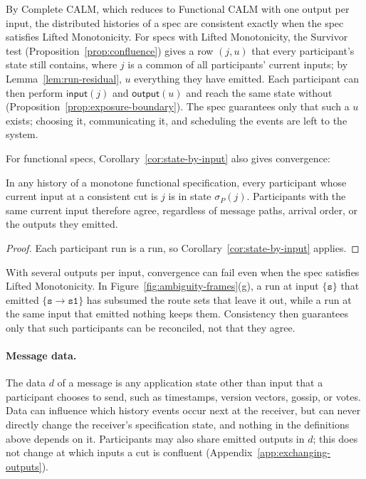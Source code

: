 By Complete CALM, which reduces to Functional CALM with one output per input,
the distributed histories of a spec are consistent exactly when the spec
satisfies Lifted Monotonicity.  For specs with Lifted Monotonicity, the Survivor test
(Proposition~\ref{prop:confluence}) gives a row $(j,u)$ that every participant's
state still contains, where $j$ is a common \indesc of all participants' current
inputs; by Lemma~\ref{lem:run-residual}, $u$ \outrel everything they have
emitted.  Each participant can then perform $\mathsf{input}(j)$ and
$\mathsf{output}(u)$ and reach the same state without \commitment
(Proposition~\ref{prop:exposure-boundary}).  The spec guarantees only that such
a $u$ exists; choosing it, communicating it, and scheduling the events are left
to the system.

For functional specs,
Corollary~\ref{cor:state-by-input} also gives convergence:

\begin{corollary}[Convergence]
\label{cor:convergence}
In any history of a monotone functional specification, every
participant whose current input at a consistent cut is $j$ is in state
$\sigma_P(j)$.  Participants with the same current input therefore agree,
regardless of message paths, arrival order, or the outputs they emitted.
\end{corollary}

\begin{proof}
Each participant run is a run, so Corollary~\ref{cor:state-by-input} applies.
\end{proof}

With several outputs per input, convergence can fail even when the spec
satisfies Lifted Monotonicity.  In Figure~\ref{fig:ambiguity-frames}(g), a run at input $\{\texttt{s}\}$ that emitted
$\{\texttt{s}{\to}\texttt{s1}\}$ has subsumed the route sets that leave it out, while a run at the same input that
emitted nothing keeps them.  Consistency then guarantees only that such participants can be reconciled, not
that they agree.

\paragraph{Message data.}
The data $d$ of a message is any application state other than input that a
participant chooses to send, such as timestamps, version vectors, gossip, or votes.  Data
can influence which history events occur next at the receiver, but can
never directly change the receiver's specification state, and nothing in the
definitions above depends on it.
Participants may also share emitted outputs in $d$; this does not change
at which inputs a cut is confluent (Appendix~\ref{app:exchanging-outputs}).

